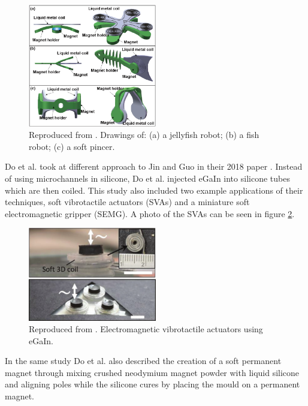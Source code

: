 \documentclass[a4paper,12pt]{article}
\begin{document}
\begin{figure}[h!]
    \centering
    \includegraphics[width=0.5\textwidth]{guoetal.png}
    \caption{Reproduced from \cite{guoLiquidMetalSpiral2018}. Drawings of: (a) a jellyfish robot; (b) a fish robot; (c) a soft pincer.}
    \label{fg:guoetal}
\end{figure}

Do et al. took at different approach to Jin and Guo in their 2018 paper \cite{doMiniatureSoftElectromagnetic2018}. Instead of using microchannels in silicone, Do et al. injected eGaIn into silicone tubes which are then coiled. This study also included two example applications of their techniques, soft vibrotactile actuators (SVAs) and a miniature soft electromagnetic gripper (SEMG). A photo of the SVAs can be seen in figure \ref{fg:guoetal}.

\begin{figure}[h!]
    \centering
    \includegraphics[width=0.5\textwidth]{doetal.png}
    \caption{Reproduced from \cite{doMiniatureSoftElectromagnetic2018}. Electromagnetic vibrotactile actuators using eGaIn.}
    \label{fg:guoetal}
\end{figure}

In the same study Do et al. also described the creation of a soft permanent magnet through mixing crushed neodymium magnet powder with liquid silicone and aligning poles while the silicone cures by placing the mould on a permanent magnet.
\end{document}
